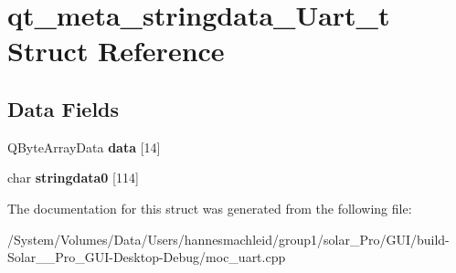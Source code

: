 \hypertarget{structqt__meta__stringdata___uart__t}{}\section{qt\+\_\+meta\+\_\+stringdata\+\_\+\+Uart\+\_\+t Struct Reference}
\label{structqt__meta__stringdata___uart__t}
\subsection*{Data Fields}
\begin{DoxyCompactItemize}
\item 
\mbox{\label{structqt__meta__stringdata___uart__t_a55b5c6d7e0071f0a6decf0dff4c94c80}} 
Q\+Byte\+Array\+Data {\bfseries data} \mbox{[}14\mbox{]}
\item 
\mbox{\label{structqt__meta__stringdata___uart__t_a3a68d29022ed625b7fc72df0a11772ec}} 
char {\bfseries stringdata0} \mbox{[}114\mbox{]}
\end{DoxyCompactItemize}


The documentation for this struct was generated from the following file\+:\begin{DoxyCompactItemize}
\item 
/\+System/\+Volumes/\+Data/\+Users/hannesmachleid/group1/solar\+\_\+\+Pro/\+G\+U\+I/build-\/\+Solar\+\_\+\+\_\+\+Pro\+\_\+\+G\+U\+I-\/\+Desktop-\/\+Debug/moc\+\_\+uart.\+cpp\end{DoxyCompactItemize}
